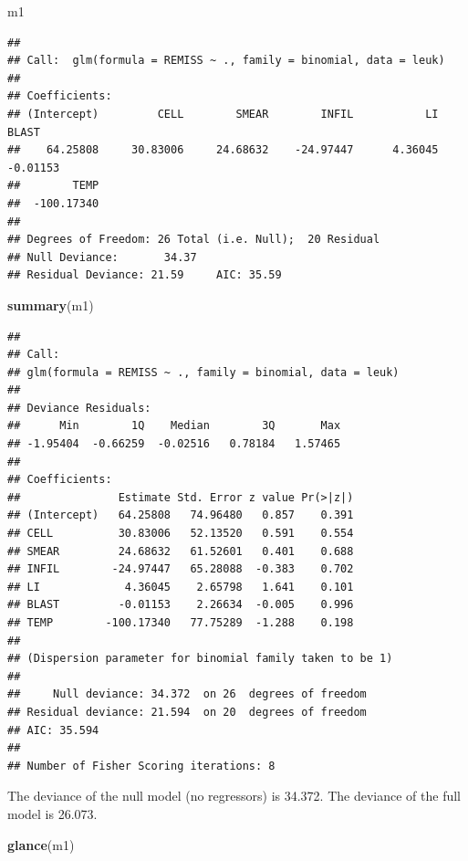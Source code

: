\documentclass[
]{book}
\newenvironment{Shaded}{\begin{snugshade}}{\end{snugshade}}
\newcommand{\KeywordTok}[1]{\textcolor[rgb]{0.13,0.29,0.53}{\textbf{#1}}}
\newcommand{\NormalTok}[1]{#1}
\begin{document}
\begin{Shaded}
\begin{Highlighting}[]
\NormalTok{m1}
\end{Highlighting}
\end{Shaded}

\begin{verbatim}
## 
## Call:  glm(formula = REMISS ~ ., family = binomial, data = leuk)
## 
## Coefficients:
## (Intercept)         CELL        SMEAR        INFIL           LI        BLAST  
##    64.25808     30.83006     24.68632    -24.97447      4.36045     -0.01153  
##        TEMP  
##  -100.17340  
## 
## Degrees of Freedom: 26 Total (i.e. Null);  20 Residual
## Null Deviance:       34.37 
## Residual Deviance: 21.59     AIC: 35.59
\end{verbatim}

\begin{Shaded}
\begin{Highlighting}[]
\KeywordTok{summary}\NormalTok{(m1)}
\end{Highlighting}
\end{Shaded}

\begin{verbatim}
## 
## Call:
## glm(formula = REMISS ~ ., family = binomial, data = leuk)
## 
## Deviance Residuals: 
##      Min        1Q    Median        3Q       Max  
## -1.95404  -0.66259  -0.02516   0.78184   1.57465  
## 
## Coefficients:
##               Estimate Std. Error z value Pr(>|z|)
## (Intercept)   64.25808   74.96480   0.857    0.391
## CELL          30.83006   52.13520   0.591    0.554
## SMEAR         24.68632   61.52601   0.401    0.688
## INFIL        -24.97447   65.28088  -0.383    0.702
## LI             4.36045    2.65798   1.641    0.101
## BLAST         -0.01153    2.26634  -0.005    0.996
## TEMP        -100.17340   77.75289  -1.288    0.198
## 
## (Dispersion parameter for binomial family taken to be 1)
## 
##     Null deviance: 34.372  on 26  degrees of freedom
## Residual deviance: 21.594  on 20  degrees of freedom
## AIC: 35.594
## 
## Number of Fisher Scoring iterations: 8
\end{verbatim}

The deviance of the null model (no regressors) is 34.372. The deviance of the full model is 26.073.

\begin{Shaded}
\begin{Highlighting}[]
\KeywordTok{glance}\NormalTok{(m1)}
\end{Highlighting}
\end{Shaded}
\end{document}
